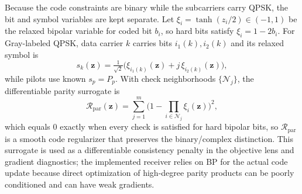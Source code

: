 \documentclass[journal]{IEEEtran}
\begin{document}
Because the code constraints are binary while the subcarriers carry QPSK, the bit
and symbol variables are kept separate. Let $\xi_i=\tanh(z_i/2)\in(-1,1)$ be the
relaxed bipolar variable for coded bit $b_i$, so hard bits satisfy
$\xi_i=1-2b_i$. For Gray-labeled QPSK, data carrier $k$ carries bits
$i_1(k),i_2(k)$ and its relaxed symbol is
\begin{equation}
  s_k(\mathbf z)=\tfrac{1}{\sqrt2}\big(\xi_{i_1(k)}(\mathbf z)
  +j\,\xi_{i_2(k)}(\mathbf z)\big),
  \label{eq:qpsk-soft}
\end{equation}
while pilots use known $s_p=P_p$. With check neighborhoods $\{\mathcal N_j\}$,
the differentiable parity surrogate is
\begin{equation}
  \mathcal R_{\mathrm{par}}(\mathbf z)
  =\sum_{j=1}^{m}\Big(1-\prod_{i\in\mathcal N_j}\xi_i(\mathbf z)\Big)^2 ,
  \label{eq:soft-parity}
\end{equation}
which equals $0$ exactly when every check is satisfied for hard bipolar bits, so
$\mathcal R_{\mathrm{par}}$ is a smooth code regularizer that preserves the
binary/complex distinction.
This surrogate is used as a differentiable consistency penalty in the objective
lens and gradient diagnostics; the implemented receiver relies on BP for the
actual code update because direct optimization of high-degree parity products
can be poorly conditioned and can have weak gradients.
\end{document}
